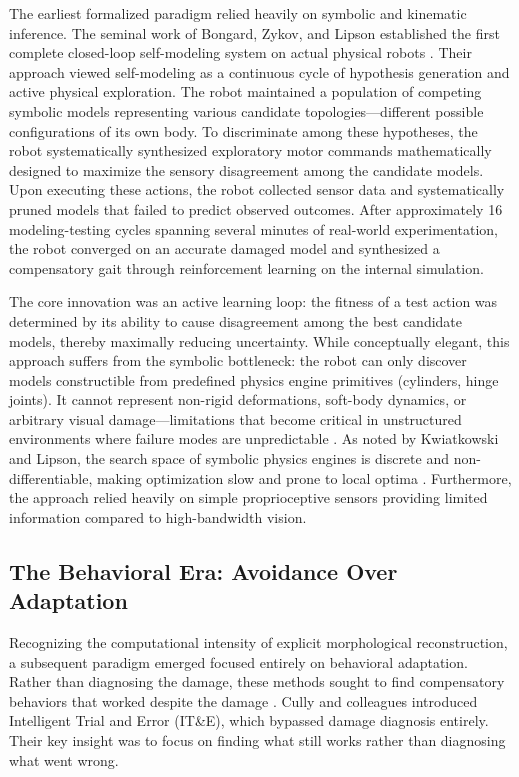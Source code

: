 \documentclass[12pt,a4paper,oneside]{report}
\begin{document}
The earliest formalized paradigm relied heavily on symbolic and kinematic inference. The seminal work of Bongard, Zykov, and Lipson established the first complete closed-loop self-modeling system on actual physical robots \cite{bongard2006resilient}. Their approach viewed self-modeling as a continuous cycle of hypothesis generation and active physical exploration. The robot maintained a population of competing symbolic models representing various candidate topologies---different possible configurations of its own body. To discriminate among these hypotheses, the robot systematically synthesized exploratory motor commands mathematically designed to maximize the sensory disagreement among the candidate models. Upon executing these actions, the robot collected sensor data and systematically pruned models that failed to predict observed outcomes. After approximately 16 modeling-testing cycles spanning several minutes of real-world experimentation, the robot converged on an accurate damaged model and synthesized a compensatory gait through reinforcement learning on the internal simulation.

The core innovation was an active learning loop: the fitness of a test action was determined by its ability to cause disagreement among the best candidate models, thereby maximally reducing uncertainty. While conceptually elegant, this approach suffers from the symbolic bottleneck: the robot can only discover models constructible from predefined physics engine primitives (cylinders, hinge joints). It cannot represent non-rigid deformations, soft-body dynamics, or arbitrary visual damage---limitations that become critical in unstructured environments where failure modes are unpredictable \cite{kwiatkowski2019task}. As noted by Kwiatkowski and Lipson, the search space of symbolic physics engines is discrete and non-differentiable, making optimization slow and prone to local optima \cite{kwiatkowski2019task}. Furthermore, the approach relied heavily on simple proprioceptive sensors providing limited information compared to high-bandwidth vision.
\subsection{The Behavioral Era: Avoidance Over Adaptation}
\label{subsec:behavioral_era}

Recognizing the computational intensity of explicit morphological reconstruction, a subsequent paradigm emerged focused entirely on behavioral adaptation. Rather than diagnosing the damage, these methods sought to find compensatory behaviors that worked despite the damage \cite{cully2015robots}. Cully and colleagues introduced Intelligent Trial and Error (IT\&E), which bypassed damage diagnosis entirely. Their key insight was to focus on finding what still works rather than diagnosing what went wrong.
\end{document}
